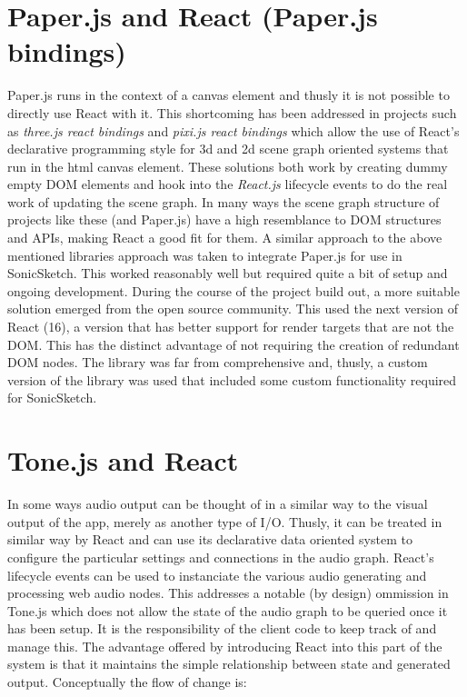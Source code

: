 \documentclass[12pt]{report}
\begin{document}
\section{Paper.js and React (Paper.js bindings)}
\label{sec:org576e7cf}
Paper.js runs in the context of a canvas element and thusly it is not possible
to directly use React with it. This shortcoming has been addressed in projects
such as \emph{three.js react bindings} and \emph{pixi.js react bindings} which allow the
use of React's declarative programming style for 3d and 2d scene graph oriented
systems that run in the html canvas element. These solutions both work by
creating dummy empty DOM elements and hook into the \emph{React.js} lifecycle events
to do the real work of updating the scene graph. In many ways the scene graph
structure of projects like these (and Paper.js) have a high resemblance to DOM
structures and APIs, making React a good fit for them. A similar approach to the
above mentioned libraries approach was taken to integrate Paper.js for use in
SonicSketch. This worked reasonably well but required quite a bit of setup and
ongoing development. During the course of the project build out, a more suitable
solution emerged from the open source community. This used
the next version of React (16), a version that has better support for render
targets that are not the DOM. This has the distinct advantage of not requiring the
creation of redundant DOM nodes. The library was far from comprehensive and,
thusly, a custom version of the library was used that included some custom
functionality required for SonicSketch.

\section{Tone.js and React}
\label{sec:org0dc5f5f}
In some ways audio output can be thought of in a similar way to the visual
output of the app, merely as another type of I/O. Thusly, it can be treated in
similar way by React and can use its declarative data oriented system to
configure the particular settings and connections in the audio graph. React's
lifecycle events can be used to instanciate the various audio generating and
processing web audio nodes. This addresses a notable (by design) ommission in
Tone.js which does not allow the state of the audio graph to be queried once it
has been setup. It is the responsibility of the client code to keep track of and
manage this. The advantage offered by introducing React into this part of the
system is that it maintains the simple relationship between state and generated
output. Conceptually the flow of change is:
\end{document}
